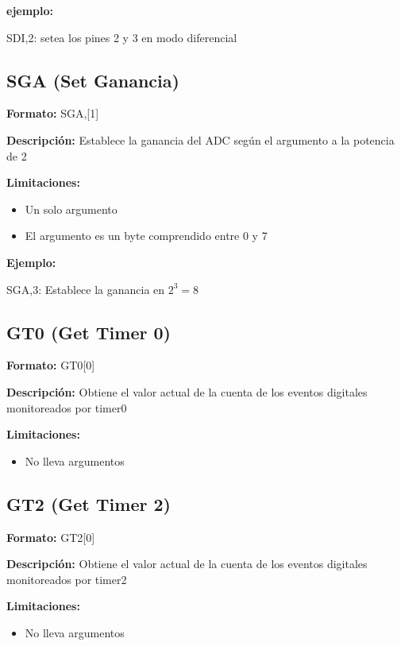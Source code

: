 \documentclass{article}
\theoremstyle{definition}
\theoremstyle{remark}
\begin{document}
\textbf{ejemplo:}

SDI,2: setea los pines 2 y 3 en modo diferencial

\subsection{SGA (Set Ganancia)} %
\label{sub:sga_set_ganancia}


\textbf{Formato:} SGA,[1]

\textbf{Descripci\'on:}
Establece la ganancia del ADC según el argumento a la potencia de 2

\textbf{Limitaciones:}
\begin{itemize}
  \item Un solo argumento
  \item El argumento es un byte comprendido entre 0 y 7
\end{itemize}

\textbf{Ejemplo:}

SGA,3: Establece la ganancia en $2^{3} = 8$


\subsection{GT0 (Get Timer 0)} %
\label{sub:gt0_get_timer_0}


\textbf{Formato:} GT0[0]

\textbf{Descripci\'on:}
Obtiene el valor actual de la cuenta de los eventos digitales monitoreados por timer0

\textbf{Limitaciones:}
\begin{itemize}
  \item No lleva argumentos
\end{itemize}

\subsection{GT2 (Get Timer 2)} %
\label{sub:gt2_get_timer_2}

\textbf{Formato:} GT2[0]

\textbf{Descripci\'on:}
Obtiene el valor actual de la cuenta de los eventos digitales monitoreados por timer2

\textbf{Limitaciones:}
\begin{itemize}
  \item No lleva argumentos
\end{itemize}
\end{document}
